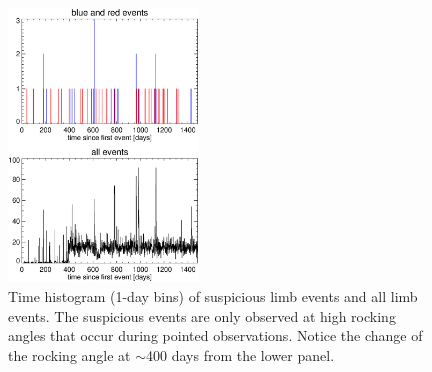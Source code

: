 \documentclass[aps,twocolumn,prd,superscriptaddress,showpacs,nofootinbib,fixfloat]{revtex4}
\begin{document}
\begin{figure}
  \centering
  \includegraphics[width=0.45\textwidth]{plots/timehist.ps}
  \caption{Time histogram (1-day bins) of suspicious limb
  events and all limb events.  The suspicious events are
  only observed at high rocking angles that occur during
  pointed observations. Notice the change of the rocking
  angle at $\sim$400 days from the lower panel.}
  \label{fig:timehist}
\end{figure}
\end{document}
